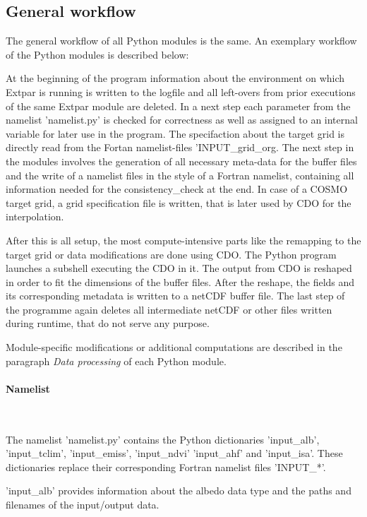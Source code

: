 \documentclass[a4paper,10pt,DIV14,BCOR1cm,titlepage,twoside]{scrartcl}
\begin{document}
\subsection{General workflow}\label{General workflow}
The general workflow of all Python modules is the same. An exemplary workflow of the Python modules is described below:

\noindent At the beginning of the program information about the environment on which Extpar is running is written to the logfile and all left-overs from prior executions of the same Extpar module are deleted. In a next step each parameter from the namelist 'namelist.py' is checked for correctness as well as assigned to an internal variable for later use in the program. The specifaction about the target grid is directly read from the Fortan namelist-files 'INPUT\_grid\_org. The next step in the modules involves the generation of all necessary meta-data for the buffer files and the write of a namelist files in the style of a Fortran namelist, containing all information needed for the consistency\_check at the end. In case of a COSMO target grid, a grid specification file is written, that is later used by CDO for the interpolation. 

\noindent After this is all setup, the most compute-intensive parts like the remapping to the target grid or data modifications are done using CDO. The Python program launches a subshell executing the CDO in it.
The output from CDO is reshaped in order to fit the dimensions of the buffer files. After the reshape, the fields and its corresponding metadata is written to a netCDF buffer file. The last step of the programme again deletes all intermediate netCDF or other files written during runtime, that do not serve any purpose.

\noindent Module-specific modifications or additional computations are described in the paragraph \textit{Data processing} of each Python module.
\paragraph{Namelist}\ \par\medskip\noindent
\noindent The namelist 'namelist.py' contains the Python dictionaries 'input\_alb', 'input\_tclim', 'input\_emiss', 'input\_ndvi' 'input\_ahf' and 'input\_isa'. These dictionaries replace their corresponding Fortran namelist files 'INPUT\_*'.

\noindent 'input\_alb' provides information about the albedo data type and the paths and filenames of the input/output data.
\end{document}
